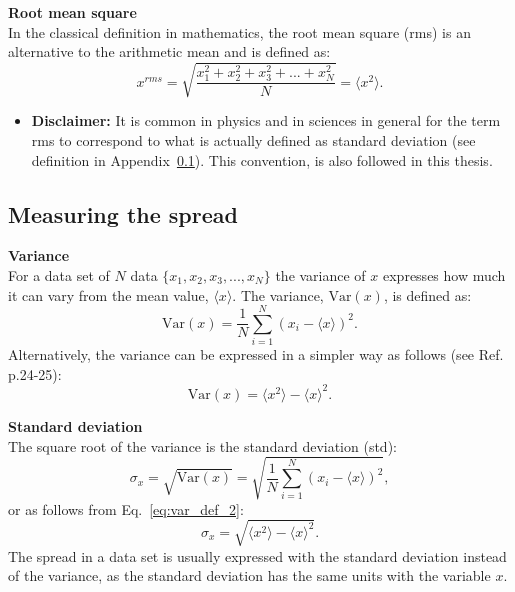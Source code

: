 \normalsize{\textbf{Root mean square}}\\
In the classical definition in mathematics, the root mean square (rms) is an alternative to the arithmetic mean and is defined as:
\begin{equation}\label{eq:rms_def}
    x^{rms} = \sqrt{\frac{x_1^2+x_2^2+x_3^2+...+x_N^2}{N}}=\langle x^2 \rangle.
\end{equation}
\begin{itemize}
\item \textbf{Disclaimer:} It is common in physics and in sciences in general for the term rms to correspond to what is actually defined as standard deviation (see definition in Appendix~\ref{app:meas_spread}). This convention, is also followed in this thesis.
\end{itemize}
\subsection{Measuring the spread}\label{app:meas_spread}
\normalsize{\textbf{Variance}}\\
For a data set of $N$ data $\{ x_1, x_2, x_3, ..., x_N \}$ the variance of $x$  expresses how much it can vary from the mean value, $\langle x \rangle$. The variance, $\mathrm{Var}(x)$, is defined as:
\begin{equation}\label{eq:var_def_1}
    \mathrm{Var}(x) = \frac{1}{N} \sum_{i=1}^{N} (x_i-\langle x \rangle)^2.
\end{equation}
Alternatively, the variance can be expressed in a simpler way as follows (see Ref.~\cite{lvp.b313005720130101} p.24-25):
\begin{equation}\label{eq:var_def_2}
    \mathrm{Var}(x) = \langle x^2 \rangle - \langle x \rangle^2.
\end{equation}

\normalsize{\textbf{Standard deviation}}\\
The square root of the variance is the standard deviation (std):
\begin{equation}\label{eq:std_def_1}
    \sigma_x = \sqrt{\mathrm{Var}(x)} = \sqrt{\frac{1}{N} \sum_{i=1}^{N} (x_i-\langle x \rangle)^2},
\end{equation}
or as follows from Eq.~\eqref{eq:var_def_2}:
\begin{equation}\label{eq:std_def_2}
    \sigma_x = \sqrt{\langle x^2 \rangle - \langle x \rangle^2}.
\end{equation}
The spread in a data set is usually expressed with the standard deviation instead of the variance, as the standard deviation has the same units with the variable $x$.

